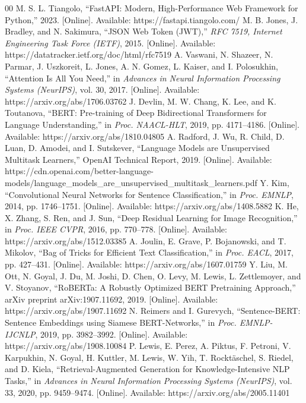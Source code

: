 \documentclass[conference]{IEEEtran}
\begin{document}
\begin{thebibliography}{00}
 M. S. L. Tiangolo, ``FastAPI: Modern, High-Performance Web Framework for Python,'' 2023. [Online]. Available: https://fastapi.tiangolo.com/
 M. B. Jones, J. Bradley, and N. Sakimura, ``JSON Web Token (JWT),'' \textit{RFC 7519, Internet Engineering Task Force (IETF)}, 2015. [Online]. Available: https://datatracker.ietf.org/doc/html/rfc7519
 A. Vaswani, N. Shazeer, N. Parmar, J. Uszkoreit, L. Jones, A. N. Gomez, L. Kaiser, and I. Polosukhin, ``Attention Is All You Need,'' in \textit{Advances in Neural Information Processing Systems (NeurIPS)}, vol. 30, 2017. [Online]. Available: https://arxiv.org/abs/1706.03762
 J. Devlin, M. W. Chang, K. Lee, and K. Toutanova, ``BERT: Pre-training of Deep Bidirectional Transformers for Language Understanding,'' in \textit{Proc. NAACL-HLT}, 2019, pp. 4171--4186. [Online]. Available: https://arxiv.org/abs/1810.04805
 A. Radford, J. Wu, R. Child, D. Luan, D. Amodei, and I. Sutskever, ``Language Models are Unsupervised Multitask Learners,'' OpenAI Technical Report, 2019. [Online]. Available: https://cdn.openai.com/better-language-models/language\_models\_are\_unsupervised\_multitask\_learners.pdf
 Y. Kim, ``Convolutional Neural Networks for Sentence Classification,'' in \textit{Proc. EMNLP}, 2014, pp. 1746--1751. [Online]. Available: https://arxiv.org/abs/1408.5882
 K. He, X. Zhang, S. Ren, and J. Sun, ``Deep Residual Learning for Image Recognition,'' in \textit{Proc. IEEE CVPR}, 2016, pp. 770--778. [Online]. Available: https://arxiv.org/abs/1512.03385
 A. Joulin, E. Grave, P. Bojanowski, and T. Mikolov, ``Bag of Tricks for Efficient Text Classification,'' in \textit{Proc. EACL}, 2017, pp. 427--431. [Online]. Available: https://arxiv.org/abs/1607.01759
 Y. Liu, M. Ott, N. Goyal, J. Du, M. Joshi, D. Chen, O. Levy, M. Lewis, L. Zettlemoyer, and V. Stoyanov, ``RoBERTa: A Robustly Optimized BERT Pretraining Approach,'' arXiv preprint arXiv:1907.11692, 2019. [Online]. Available: https://arxiv.org/abs/1907.11692
 N. Reimers and I. Gurevych, ``Sentence-BERT: Sentence Embeddings using Siamese BERT-Networks,'' in \textit{Proc. EMNLP-IJCNLP}, 2019, pp. 3982--3992. [Online]. Available: https://arxiv.org/abs/1908.10084
 P. Lewis, E. Perez, A. Piktus, F. Petroni, V. Karpukhin, N. Goyal, H. Kuttler, M. Lewis, W. Yih, T. Rockt\"{a}schel, S. Riedel, and D. Kiela, ``Retrieval-Augmented Generation for Knowledge-Intensive NLP Tasks,'' in \textit{Advances in Neural Information Processing Systems (NeurIPS)}, vol. 33, 2020, pp. 9459--9474. [Online]. Available: https://arxiv.org/abs/2005.11401

\end{thebibliography}
\end{document}
